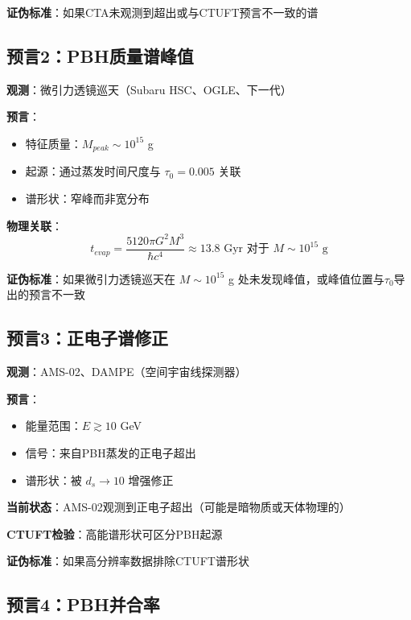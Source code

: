 \textbf{证伪标准}：如果CTA未观测到超出或与CTUFT预言不一致的谱

\subsection{预言2：PBH质量谱峰值}
\label{subsec:prediction-mass}

\textbf{观测}：微引力透镜巡天（Subaru HSC、OGLE、下一代）

\textbf{预言}：
\begin{itemize}
    \item 特征质量：$M_{peak} \sim 10^{15}$ g
    \item 起源：通过蒸发时间尺度与 $\tau_0 = 0.005$ 关联
    \item 谱形状：窄峰而非宽分布
\end{itemize}

\textbf{物理关联}：
\begin{equation}
t_{evap} = \frac{5120\pi G^2 M^3}{\hbar c^4} \approx 13.8 \text{ Gyr 对于 } M \sim 10^{15} \text{ g}
\label{eq:evaporation-time}
\end{equation}

\textbf{证伪标准}：如果微引力透镜巡天在 $M \sim 10^{15}$ g 处未发现峰值，或峰值位置与$\tau_0$导出的预言不一致

\subsection{预言3：正电子谱修正}
\label{subsec:prediction-positron}

\textbf{观测}：AMS-02、DAMPE（空间宇宙线探测器）

\textbf{预言}：
\begin{itemize}
    \item 能量范围：$E \gtrsim 10$ GeV
    \item 信号：来自PBH蒸发的正电子超出
    \item 谱形状：被 $d_s \to 10$ 增强修正
\end{itemize}

\textbf{当前状态}：AMS-02观测到正电子超出（可能是暗物质或天体物理的）

\textbf{CTUFT检验}：高能谱形状可区分PBH起源

\textbf{证伪标准}：如果高分辨率数据排除CTUFT谱形状

\subsection{预言4：PBH并合率}
\label{subsec:prediction-merger}

